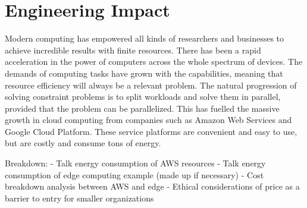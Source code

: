 \documentclass[../mthe-493-final-project.tex]{subfiles}
\begin{document}
    \chapter{Engineering Impact}
    \label{ch:engineering-impact}
    
    Modern computing has empowered all kinds of researchers and businesses to achieve incredible results with finite resources. There has been a rapid acceleration in the power of computers across the whole spectrum of devices. The demands of computing tasks have grown with the capabilities, meaning that resource efficiency will always be a relevant problem. The natural progression of solving constraint problems is to split workloads and solve them in parallel, provided that the problem can be parallelized. This has fuelled the massive growth in cloud computing from companies such as Amazon Web Services and Google Cloud Platform. These service platforms are convenient and easy to use, but are costly and consume tons of energy. 
    
    
    Breakdown: 
    - Talk energy consumption of AWS resources
    - Talk energy consumption of edge computing example (made up if necessary)
    - Cost breakdown analysis between AWS and edge
    - Ethical considerations of price as a barrier to entry for smaller organizations
    

    
\end{document}
